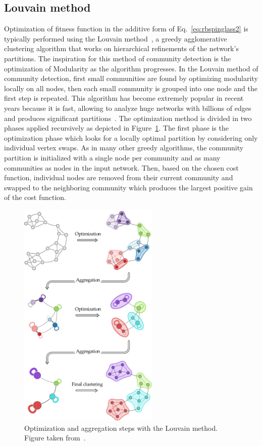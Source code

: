 \subsection{Louvain method}\label{sec:louvain_method}
Optimization of fitness function in the additive form of Eq.~\ref{eq:rbspinglass2} is typically performed using the Louvain method~\cite{blondel2008}, a greedy agglomerative clustering algorithm that works on hierarchical refinements of the network's partitions. The inspiration for this method of community detection is the optimization of Modularity as the algorithm progresses. In the Louvain method of community detection, first small communities are found by optimizing modularity locally on all nodes, then each small community is grouped into one node and the first step is repeated.
This algorithm has become extremely popular in recent years because it is fast, allowing to analyze huge networks with billions of edges and produces significant partitions~\cite{lancichinetti2009}.  The optimization method is divided in two phases applied recursively as depicted in Figure~\ref{fig:louvain_method}. The first phase is the optimization phase which looks for a locally optimal partition by considering only individual vertex swaps. As in many other greedy algorithms, the community partition is initialized with a single node per community and as many communities as nodes in the input network. Then, based on the chosen cost function, individual nodes are removed from their current community and swapped to the neighboring community which produces the largest positive gain of the cost function.

\begin{figure}[htb!]
\centering
\includegraphics[width=0.6\textwidth]{images/louvain_method.pdf}
\caption{Optimization and aggregation steps with the Louvain method. Figure taken from~\cite{browet2014}.}
\label{fig:louvain_method}
\end{figure}

